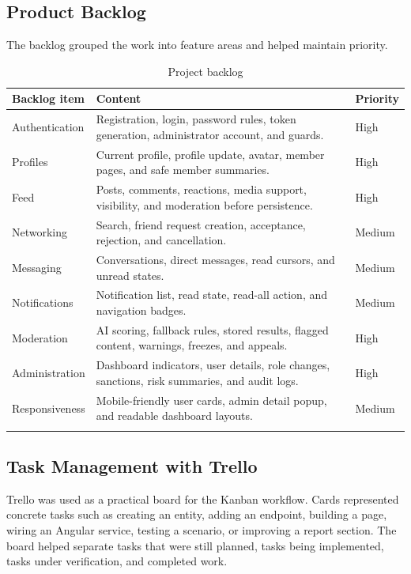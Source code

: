 \subsection{Product Backlog}

The backlog grouped the work into feature areas and helped maintain priority.

\begin{longtable}{|m{3.5cm}|m{8.4cm}|m{2.2cm}|}
\hline
\textbf{Backlog item} & \textbf{Content} & \textbf{Priority} \\
\hline
Authentication & Registration, login, password rules, token generation, administrator account, and guards. & High \\
\hline
Profiles & Current profile, profile update, avatar, member pages, and safe member summaries. & High \\
\hline
Feed & Posts, comments, reactions, media support, visibility, and moderation before persistence. & High \\
\hline
Networking & Search, friend request creation, acceptance, rejection, and cancellation. & Medium \\
\hline
Messaging & Conversations, direct messages, read cursors, and unread states. & Medium \\
\hline
Notifications & Notification list, read state, read-all action, and navigation badges. & Medium \\
\hline
Moderation & AI scoring, fallback rules, stored results, flagged content, warnings, freezes, and appeals. & High \\
\hline
Administration & Dashboard indicators, user details, role changes, sanctions, risk summaries, and audit logs. & High \\
\hline
Responsiveness & Mobile-friendly user cards, admin detail popup, and readable dashboard layouts. & Medium \\
\hline
\caption{Project backlog}
\end{longtable}

\subsection{Task Management with Trello}

Trello was used as a practical board for the Kanban workflow. Cards represented concrete tasks such as creating an entity, adding an endpoint, building a page, wiring an Angular service, testing a scenario, or improving a report section. The board helped separate tasks that were still planned, tasks being implemented, tasks under verification, and completed work.

